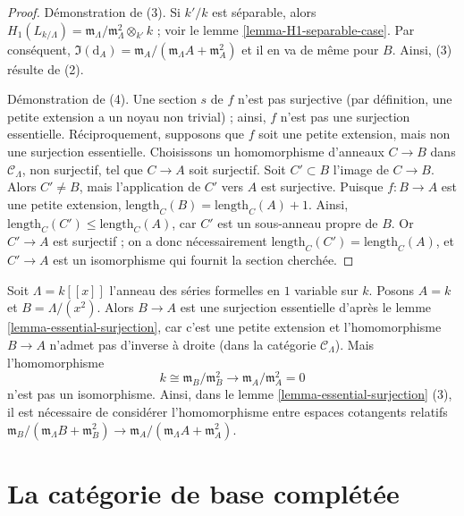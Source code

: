 \begin{proof}
\medskip\noindent
Démonstration de (3). Si $k'/k$ est séparable, alors
$H_1(L_{k/\Lambda}) =
\mathfrak m_\Lambda/\mathfrak m_\Lambda^2 \otimes_{k'} k$ ; voir le lemme
\ref{lemma-H1-separable-case}. Par conséquent, $\Im(\text{d}_A) =
\mathfrak m_A/(\mathfrak m_\Lambda A + \mathfrak m_A^2)$
et il en va de même pour $B$. Ainsi, (3) résulte de (2).

\medskip\noindent
Démonstration de (4). Une section $s$ de $f$ n'est pas surjective (par
définition, une petite extension a un noyau non trivial) ; ainsi, $f$ n'est pas
une surjection essentielle. Réciproquement, supposons que $f$ soit une petite
extension, mais non une surjection essentielle. Choisissons un homomorphisme
d'anneaux $C \to B$ dans $\mathcal{C}_\Lambda$, non surjectif, tel que
$C \to A$ soit surjectif. Soit $C' \subset B$ l'image de $C \to B$. Alors
$C' \not = B$, mais l'application de $C'$ vers $A$ est surjective. Puisque
$f : B \to A$ est une petite extension,
$\text{length}_C(B) = \text{length}_C(A) + 1$. Ainsi,
$\text{length}_C(C') \leq \text{length}_C(A)$, car $C'$ est un sous-anneau
propre de $B$. Or $C' \to A$ est surjectif ; on a donc nécessairement
$\text{length}_C(C') = \text{length}_C(A)$, et $C' \to A$ est un
isomorphisme qui fournit la section cherchée.
\end{proof}

\begin{example}
\label{example-essential-surjection}
Soit $\Lambda = k[[x]]$ l'anneau des séries formelles en $1$ variable sur $k$.
Posons $A = k$ et $B = \Lambda/(x^2)$. Alors $B \to A$ est une surjection
essentielle d'après le lemme \ref{lemma-essential-surjection}, car c'est une
petite extension et l'homomorphisme $B \to A$ n'admet pas d'inverse à droite
(dans la catégorie $\mathcal{C}_\Lambda$). Mais l'homomorphisme
$$
k \cong \mathfrak m_B/\mathfrak m_B^2
\longrightarrow
\mathfrak m_A/\mathfrak m_A^2 = 0
$$
n'est pas un isomorphisme. Ainsi, dans le lemme
\ref{lemma-essential-surjection} (3), il est nécessaire de considérer
l'homomorphisme entre espaces cotangents relatifs
$\mathfrak m_B/(\mathfrak m_\Lambda B + \mathfrak m_B^2) \to
\mathfrak m_A/(\mathfrak m_\Lambda A + \mathfrak m_A^2)$.
\end{example}







\section{La catégorie de base complétée}
\label{section-category-completion-CLambda}

